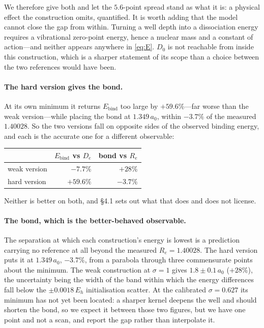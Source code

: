 \documentclass[11pt,a4paper]{article}
\begin{document}
We therefore give both and let the $5.6$-point spread stand as what it is: a physical effect the
construction omits, quantified. It is worth adding that the model cannot close the gap from within.
Turning a well depth into a dissociation energy requires a vibrational zero-point energy, hence a
nuclear mass and a constant of action---and neither appears anywhere in \eqref{eq:E}. $D_0$ is not
reachable from inside this construction, which is a sharper statement of its scope than a choice
between the two references would have been.

\paragraph{The hard version gives the bond.} At its own minimum it returns $E_{\text{bind}}$ too
large by $\mathbf{+59.6\%}$---far worse than the weak version---while placing the bond at
$1.349\,a_0$, within $\mathbf{-3.7\%}$ of the measured $1.40028$. So the two versions fall on
opposite sides of the observed binding energy, and each is the accurate one for a different
observable:
\begin{center}
\begin{tabular}{lrr}
\toprule
 & $E_{\text{bind}}$ vs $D_e$ & bond vs $R_e$ \\
\midrule
weak version & $\mathbf{-7.7\%}$ & $+28\%$ \\
hard version & $+59.6\%$ & $\mathbf{-3.7\%}$ \\
\bottomrule
\end{tabular}
\end{center}
Neither is better on both, and \S4.1 sets out what that does and does not license.

\paragraph{The bond, which is the better-behaved observable.} The separation at which each
construction's energy is lowest is a prediction carrying no reference at all beyond the measured
$R_e = 1.40028$. The hard version puts it at $1.349\,a_0$, \textbf{$-3.7\%$}, from a parabola
through three commensurate points about the minimum. The weak construction at $\sigma = 1$ gives
$1.8 \pm 0.1\,a_0$ ($+28\%$), the uncertainty being the width of the band within which the energy
differences fall below the $\pm 0.0018\,E_h$ initialisation scatter. At the calibrated
$\sigma = 0.627$ its minimum has not yet been located: a sharper kernel deepens the well and should
shorten the bond, so we expect it between those two figures, but we have one point and not a scan,
and report the gap rather than interpolate it.
\end{document}
